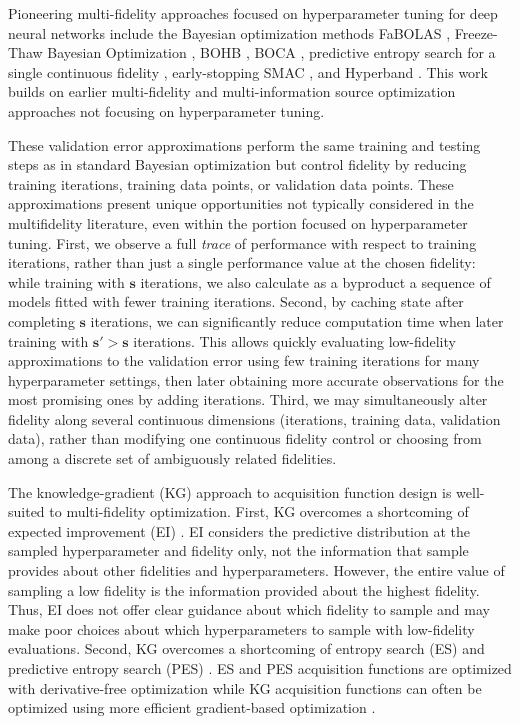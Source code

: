 \documentclass[letterpaper]{article}
\newcommand{\s}{\mathbf{s}}
\numberwithin{equation}{section}
\begin{document}
Pioneering multi-fidelity approaches focused on hyperparameter tuning for deep neural networks
include the Bayesian optimization methods FaBOLAS \citep{klein2016fast,klein2015towards}, Freeze-Thaw Bayesian Optimization \citep{swersky2014freeze}, BOHB \citep{falkner2018bohb}, BOCA \citep{kandasamy2017multi}, predictive entropy search for a single continuous fidelity \citep{mcleod2017practical}, early-stopping SMAC \citep{domhan2015speeding}, and
Hyperband \citep{li2016hyperband}.
This work builds on
earlier multi-fidelity and multi-information source optimization approaches \citep{huang2006sequential,lam2015multifidelity,poloczek2016multi} 
not focusing on hyperparameter tuning.

These validation error approximations 
perform the same training and testing steps as in standard Bayesian optimization but control fidelity by reducing training iterations, training data points, or validation data points. 
These approximations present unique opportunities not typically considered in the multifidelity literature, even within the portion focused on hyperparameter tuning. 
First, we observe a full \emph{trace} of performance with respect to training iterations, rather than just a single performance value at the chosen fidelity:
while training with $\s$ iterations, we also calculate as a byproduct a sequence of models fitted with fewer training iterations.  
Second, by caching state after completing $\s$ iterations, we can significantly reduce computation time when later training with $\s'>\s$ iterations.  This allows quickly evaluating low-fidelity approximations to the validation error using few training iterations for many hyperparameter settings, then later obtaining 
more accurate observations for the most promising ones by adding iterations.
Third, we may simultaneously alter fidelity along several continuous dimensions (iterations, training data, validation data), rather than modifying one continuous fidelity control or choosing from among a discrete set of ambiguously related fidelities.

The knowledge-gradient (KG) approach to acquisition function design \citep{frazier2009knowledge,frazier2018tutorial} is well-suited to multi-fidelity optimization.
First, KG overcomes a shortcoming of expected improvement (EI) \citep{mockus1989bayesian}.
EI considers the predictive distribution at the sampled hyperparameter and fidelity only,
not the information that sample provides about other fidelities and hyperparameters.
However, the entire value of sampling a low fidelity is the information provided
about the highest fidelity. 
Thus, EI does not offer clear guidance about which fidelity to sample
and may make poor choices about which hyperparameters to sample with low-fidelity evaluations.
Second, KG overcomes a shortcoming of entropy search (ES) \citep{hennig2012entropy} and predictive entropy search (PES) \citep{hernandez2014predictive}.
ES and PES acquisition functions are optimized with derivative-free optimization 
\citep{klein2016fast,klein2015towards,swersky2014freeze,mcleod2017practical} while 
KG acquisition functions can often be optimized using more efficient gradient-based optimization \citep{wu2016parallel}.
\end{document}
